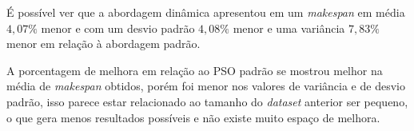 \begin{table}[!htb]
    \centering
    \caption{Tabela de dados estatísticos da execução do problema B}
    \label{tab:tableB-freq-mk}
\end{table}
É possível ver que a abordagem dinâmica 
apresentou em 
um \textit{makespan} em média $4,07\%$ menor e com um
desvio padrão $4,08\%$ menor e uma
variância $7,83\%$ menor
em relação à abordagem padrão.


A porcentagem de melhora em relação ao PSO padrão se mostrou melhor na média de \textit{makespan} obtidos, porém foi menor nos valores de variância e de desvio padrão, isso parece estar relacionado ao tamanho do \textit{dataset} anterior ser pequeno, o que gera menos resultados possíveis e não existe muito espaço de melhora.



